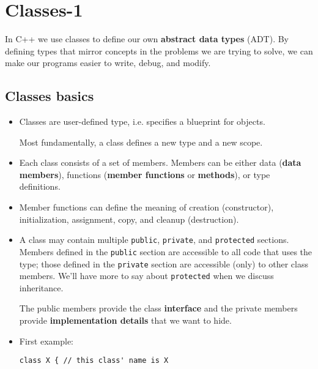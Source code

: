 
\chapter{Classes-1}
\thispagestyle{empty}

In C++ we use classes to define our own \textbf{abstract data types} (ADT). By defining types that mirror concepts in the problems we are trying to solve, we can make our programs easier to write,
debug, and modify.

\section{Classes basics} %
\label{sec:classes_basics}

\begin{itemize}[$\triangleright$]
\item Classes are user-defined type, i.e. specifies a blueprint for objects.

\begin{marker}
    Most fundamentally, a class defines a new type and a new scope.
\end{marker}

\item Each class consists of a set of members. Members can be either data (\textbf{data members}), functions (\textbf{member functions} or \textbf{methods}), or type definitions.

\item Member functions can define the meaning of creation (constructor), initialization, assignment, copy, and cleanup (destruction).

\item A class may contain multiple \texttt{public}, \texttt{private}, and \texttt{protected} sections. Members defined in the \texttt{public} section are accessible to all code that uses the type; those defined in the \texttt{private} section are accessible (only) to other class members. We'll have more to say about \texttt{protected} when we discuss inheritance.

\begin{marker}
The public members provide the class \textbf{interface} and the private members provide \textbf{implementation details} that we want to hide.
\end{marker}

\item First example:
\begin{lstlisting}
class X { // this class' name is X


\end{lstlisting}
\end{itemize}
